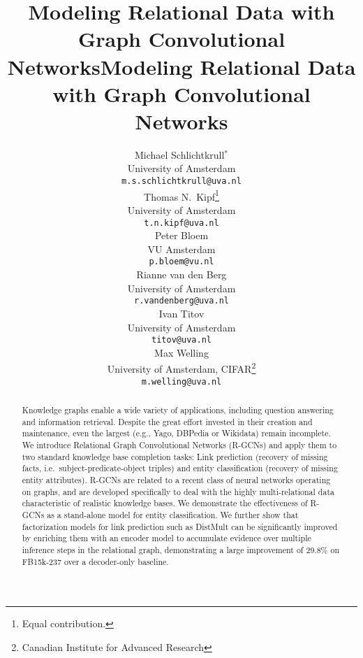 \title{Modeling Relational Data with Graph Convolutional Networks}



\title{Modeling Relational Data with Graph Convolutional Networks}

\author{
  Michael Schlichtkrull$^*$\\
  University of Amsterdam\\
  \texttt{m.s.schlichtkrull@uva.nl}\\\And
  Thomas N.~Kipf\thanks{Equal contribution.}\\
  University of Amsterdam\\
  \texttt{t.n.kipf@uva.nl}\\ \And
   Peter Bloem\\
  VU Amsterdam\\
  \texttt{p.bloem@vu.nl}\\ \AND
  Rianne van den Berg\\
  University of Amsterdam\\
  \texttt{r.vandenberg@uva.nl}\\\And
  Ivan Titov\\
  University of Amsterdam\\
  \texttt{titov@uva.nl}\\ \And
  Max Welling\\
  University of Amsterdam, CIFAR\thanks{Canadian Institute for Advanced Research}\\
  \texttt{m.welling@uva.nl}\\
}

\maketitle

\begin{abstract}

Knowledge graphs enable a wide variety of applications, including question answering and information retrieval. Despite the great effort invested in their creation and maintenance, even the largest (e.g., Yago, DBPedia or Wikidata) remain incomplete. We introduce Relational Graph Convolutional Networks (R-GCNs) and apply them to two standard knowledge base completion tasks: Link prediction (recovery of missing facts, i.e.~subject-predicate-object triples) and entity classification (recovery of missing entity attributes). R-GCNs are related to a recent class of neural networks operating on graphs, and are developed specifically to deal with the highly multi-relational data characteristic of realistic knowledge bases. We demonstrate the effectiveness of R-GCNs as a stand-alone model for entity classification. We further show that factorization models for link prediction such as DistMult can be significantly improved by enriching them with an encoder model to accumulate evidence over multiple inference steps in the relational graph, demonstrating a large improvement of 29.8\% on FB15k-237 over a decoder-only baseline.

\end{abstract}

